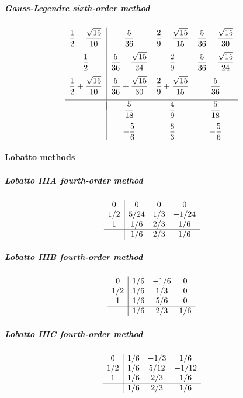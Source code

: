 \subparagraph{Gauss-Legendre sixth-order method}
\begin{equation}
	\begin{array}{c|ccc}
		\dfrac{1}{2} - \dfrac{\sqrt{15}}{10} &
		    \dfrac{5}{36} &
		        \dfrac{2}{9}- \dfrac{\sqrt{15}}{15} &
		            \dfrac{5}{36} - \dfrac{\sqrt{15}}{30} \\[1em]
		\dfrac{1}{2} &
		    \dfrac{5}{36} + \dfrac{\sqrt{15}}{24} &
		        \dfrac{2}{9} &
		            \dfrac{5}{36} - \dfrac{\sqrt{15}}{24} \\[1em]
		\dfrac{1}{2} + \dfrac{\sqrt{15}}{10} &
		    \dfrac{5}{36} + \dfrac{\sqrt{15}}{30} &
		        \dfrac{2}{9} + \dfrac{\sqrt{15}}{15} &
		            \dfrac{5}{36} \\[1em]
		\hline\\[-1em]
		& \dfrac{5}{18}
		& \dfrac{4}{9}
		& \dfrac{5}{18}
		\\[1em]
        & -\dfrac{5}{6}
        & \dfrac{8}{3}
        & -\dfrac{5}{6}
	\end{array}
	\label{eq::gauss-legendre_6}
\end{equation}

\paragraph{Lobatto methods}

\subparagraph{Lobatto IIIA fourth-order method}
\begin{equation}
	\begin{array}{c|ccc}
		0   & 0   & 0   & 0     \\
		1/2 & 5/24& 1/3 & -1/24 \\
		1   & 1/6 & 2/3 & 1/6   \\ \hline
		    & 1/6 & 2/3 & 1/6
	\end{array}
	\label{eq::lobattoiia}
\end{equation}

\subparagraph{Lobatto IIIB fourth-order method}
\begin{equation}
	\begin{array}{c|ccc}
		 0  & 1/6 & -1/6 &  0  \\
		1/2 & 1/6 & 1/3  &  0  \\
		 1  & 1/6 & 5/6  &  0  \\ \hline
		    & 1/6 & 2/3  & 1/6
	\end{array}
	\label{eq::lobattoiib}
\end{equation}

\subparagraph{Lobatto IIIC fourth-order method}
\begin{equation}
	\begin{array}{c|ccc}
		 0  & 1/6 & -1/3 &  1/6  \\
		1/2 & 1/6 & 5/12 & -1/12 \\
		 1  & 1/6 & 2/3  &  1/6  \\ \hline
		    & 1/6 & 2/3  &  1/6
	\end{array}
	\label{eq::lobattoiic}
\end{equation}

